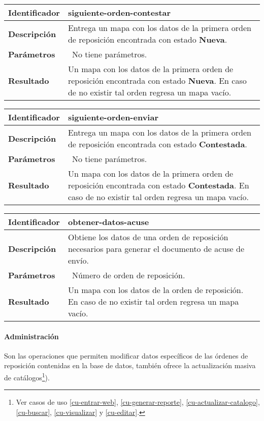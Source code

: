 	\begin{longtable}{|p{}|p{}|}
		\hline
		\textbf{Identificador}	& \textbf{siguiente-orden-contestar}\\
		\hline
		\hline
		\textbf{Descripción}	& Entrega un mapa con los datos de la primera orden de reposición encontrada con estado \textbf{Nueva}.\\
		\hline
		\textbf{Parámetros} 	& \textbullet\, No tiene parámetros.\\
		\hline
		\textbf{Resultado}		& Un mapa con los datos de la primera orden de reposición encontrada con estado \textbf{Nueva}. En caso de no existir tal orden regresa un mapa vacío.\\
		\hline
	\end{longtable}

	\begin{longtable}{|p{}|p{}|}
		\hline
		\textbf{Identificador}	& \textbf{siguiente-orden-enviar}\\
		\hline
		\hline
		\textbf{Descripción}	& Entrega un mapa con los datos de la primera orden de reposición encontrada con estado \textbf{Contestada}.\\
		\hline
		\textbf{Parámetros} 	& \textbullet\, No tiene parámetros.\\
		\hline
		\textbf{Resultado}		& Un mapa con los datos de la primera orden de reposición encontrada con estado \textbf{Contestada}. En caso de no existir tal orden regresa un mapa vacío.\\
		\hline
	\end{longtable}

	\begin{longtable}{|p{}|p{}|}
		\hline
		\textbf{Identificador}	& \textbf{obtener-datos-acuse}\\
		\hline
		\hline
		\textbf{Descripción}	& Obtiene los datos de una orden de reposición necesarios para generar el documento de acuse de envío.\\
		\hline
		\textbf{Parámetros}		& \textbullet\, Número de orden de reposición.\\
		\hline
		\textbf{Resultado}		& Un mapa con los datos de la orden de reposición. En caso de no existir tal orden regresa un mapa vacío.\\
		\hline
	\end{longtable}

\paragraph{Administración\\}
Son las operaciones que permiten modificar datos específicos de las órdenes de reposición contenidas en la base de datos, también ofrece la actualización masiva de catálogos\footnote{Ver casos de uso \ref{cu-entrar-web}, \ref{cu-generar-reporte}, \ref{cu-actualizar-catalogo}, \ref{cu-buscar}, \ref{cu-visualizar} y \ref{cu-editar}.}).

